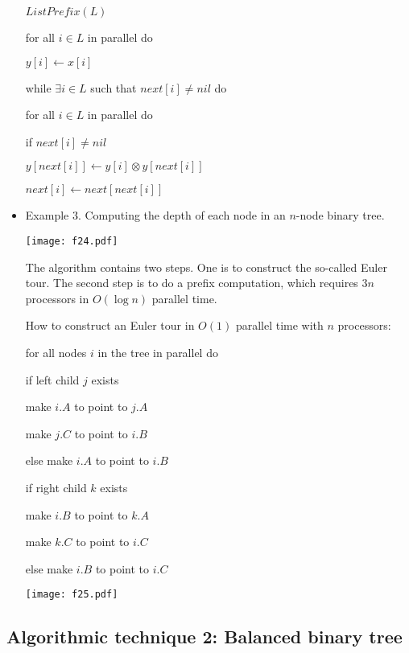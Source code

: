 \documentclass{article}
\begin{document}
\begin{itemize}
$ListPrefix(L)$

\qquad for all $i\in L$ in parallel do

\qquad\qquad $y[i]\leftarrow x[i]$

\qquad while $\exists i\in L$ such that $next[i]\not=nil$ do

\qquad\qquad for all $i\in L$ in parallel do

\qquad\qquad\qquad if $next[i]\not=nil$

\qquad\qquad\qquad\qquad $y[next[i]]\leftarrow y[i]\otimes y[next[i]]$

\qquad\qquad\qquad\qquad $next[i]\leftarrow next[next[i]]$

\item Example 3. Computing the depth of each node in an $n$-node
binary tree.

\vskip 0.25cm
\begin{center}
\texttt{[image: f24.pdf]}
\end{center}
 
The algorithm contains two steps. One is to construct the so-called
Euler tour. The second step is to do a prefix computation, which
requires $3n$ processors in $O(\log n)$ parallel time. 

How to construct an Euler tour in $O(1)$ parallel time with $n$ processors:

\qquad for all nodes $i$ in the tree in parallel do

\qquad\qquad if left child $j$ exists

\qquad\qquad\qquad make $i.A$ to point to $j.A$

\qquad\qquad\qquad make $j.C$ to point to $i.B$

\qquad\qquad else make $i.A$ to point to $i.B$

\qquad\qquad if right child $k$ exists

\qquad\qquad\qquad make $i.B$ to point to $k.A$

\qquad\qquad\qquad make $k.C$ to point to $i.C$

\qquad\qquad else make $i.B$ to point to $i.C$

\vskip 0.25cm
\begin{center}
\texttt{[image: f25.pdf]}
\end{center}

\end{itemize}

\subsection{Algorithmic technique 2: Balanced binary tree}
\end{document}
